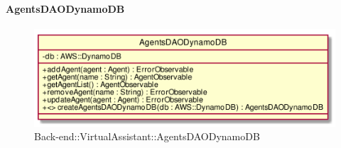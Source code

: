\hypertarget{AgentsDAODynamoDB_label}{\paragraph{AgentsDAODynamoDB}}
\begin{figure}[h]
	\centering
	\includegraphics[width=\textwidth,height=\textheight,keepaspectratio]{images/ClassAgentsDAODynamoDB.png}
	\caption{Back-end::VirtualAssistant::AgentsDAODynamoDB}
\end{figure}
